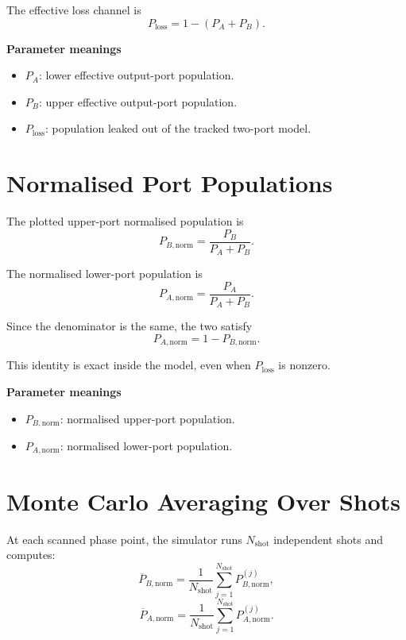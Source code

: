 \documentclass[11pt,a4paper]{article}
\begin{document}
The effective loss channel is
\begin{equation}
  P_{\mathrm{loss}} = 1 - (P_A + P_B).
\end{equation}

\textbf{Parameter meanings}
\begin{itemize}[leftmargin=1.5em]
  \item $P_A$: lower effective output-port population.
  \item $P_B$: upper effective output-port population.
  \item $P_{\mathrm{loss}}$: population leaked out of the tracked two-port model.
\end{itemize}

\section{Normalised Port Populations}

The plotted upper-port normalised population is
\begin{equation}
  P_{B,\mathrm{norm}} = \frac{P_B}{P_A + P_B}.
\end{equation}

The normalised lower-port population is
\begin{equation}
  P_{A,\mathrm{norm}} = \frac{P_A}{P_A + P_B}.
\end{equation}

Since the denominator is the same, the two satisfy
\begin{equation}
  P_{A,\mathrm{norm}} = 1 - P_{B,\mathrm{norm}}.
\end{equation}

This identity is exact inside the model, even when $P_{\mathrm{loss}}$ is nonzero.

\textbf{Parameter meanings}
\begin{itemize}[leftmargin=1.5em]
  \item $P_{B,\mathrm{norm}}$: normalised upper-port population.
  \item $P_{A,\mathrm{norm}}$: normalised lower-port population.
\end{itemize}

\section{Monte Carlo Averaging Over Shots}

At each scanned phase point, the simulator runs $N_{\mathrm{shot}}$ independent shots and computes:
\begin{equation}
  \overline{P}_{B,\mathrm{norm}} =
  \frac{1}{N_{\mathrm{shot}}}
  \sum_{j=1}^{N_{\mathrm{shot}}} P_{B,\mathrm{norm}}^{(j)},
\end{equation}
\begin{equation}
  \overline{P}_{A,\mathrm{norm}} =
  \frac{1}{N_{\mathrm{shot}}}
  \sum_{j=1}^{N_{\mathrm{shot}}} P_{A,\mathrm{norm}}^{(j)}.
\end{equation}
\end{document}
